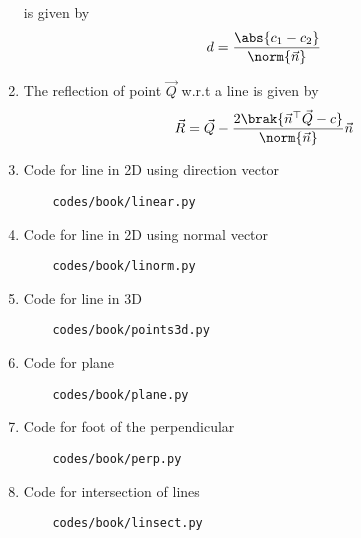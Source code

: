 \begin{enumerate}[label=\thesubsection.\arabic*.,ref=\thesubsection.\theenumi]
is given by 
\begin{align}
	\label{eq:dist_lines_2d}
	d = \frac{\abs{   c_1-c_2 }}{\norm{\vec{n}}}	
\end{align}
	\item 
The reflection of point $\vec{Q}$ w.r.t a line is given by
\begin{align}
	\label{eq:11/10/4/22}
\vec{R} = \vec{Q} -\frac{2\brak{\vec{n}^{\top}\vec{Q}-c}}{\norm{\vec{n}}}\vec{n}
\end{align}
\item Code for line in 2D using direction vector
	\begin{lstlisting}
	codes/book/linear.py
\end{lstlisting}
\item Code for line in 2D using normal vector
	\begin{lstlisting}
	codes/book/linorm.py
\end{lstlisting}
\item Code for line in 3D
	\begin{lstlisting}
	codes/book/points3d.py
\end{lstlisting}
\item Code for plane
	\begin{lstlisting}
	codes/book/plane.py
\end{lstlisting}
\item Code for foot of the perpendicular
	\begin{lstlisting}
	codes/book/perp.py
\end{lstlisting}
\item Code for intersection of lines
	\begin{lstlisting}
	codes/book/linsect.py
\end{lstlisting}
\end{enumerate}
